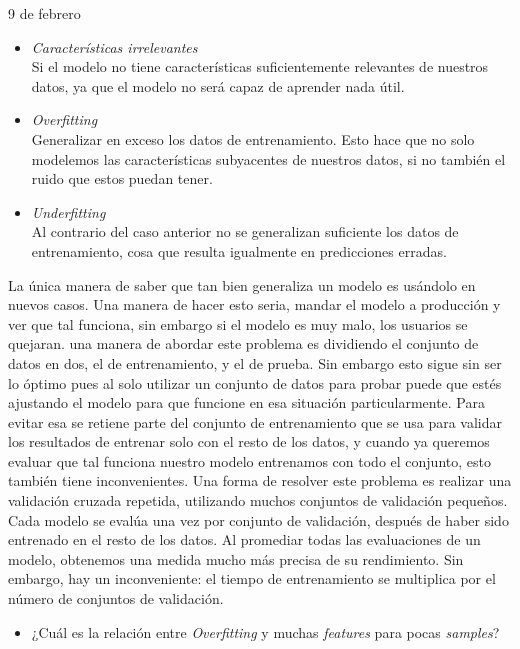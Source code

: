 \begin{entry}{9 de febrero}
\begin{itemize}
    \item\textsl{Características irrelevantes}\\
    Si el modelo no tiene características suficientemente relevantes de nuestros datos, ya que el modelo no será capaz de aprender nada útil.
    
    \item\textsl{Overfitting}\\
    Generalizar en exceso los datos de entrenamiento. Esto hace que no solo modelemos las características subyacentes de nuestros datos, si no también el ruido que estos puedan tener.
    
    \item\textsl{Underfitting}\\
    Al contrario del caso anterior no se generalizan suficiente los datos de entrenamiento, cosa que resulta igualmente en predicciones erradas.
\end{itemize}
La única manera de saber que tan bien generaliza un modelo es usándolo en nuevos casos. Una manera de hacer esto seria, mandar el modelo a producción y ver que tal funciona, sin embargo si el modelo es muy malo, los usuarios se quejaran. una manera de abordar este problema es dividiendo el conjunto de datos en dos, el de entrenamiento, y el de prueba. Sin embargo esto sigue sin ser lo óptimo pues al solo utilizar un conjunto de datos para probar puede que estés ajustando el modelo para que funcione en esa situación particularmente. Para evitar esa se retiene parte del conjunto de entrenamiento que se usa para validar los resultados de entrenar solo con el resto de los datos, y cuando ya queremos evaluar que tal funciona nuestro modelo entrenamos con todo el conjunto, esto también tiene inconvenientes. Una forma de resolver este problema es realizar una validación cruzada repetida, utilizando muchos conjuntos de validación pequeños. Cada modelo se evalúa una vez por conjunto de validación, después de haber sido entrenado en el resto de los datos. Al promediar todas las evaluaciones de un modelo, obtenemos una medida mucho más precisa de su rendimiento. Sin embargo, hay un inconveniente: el tiempo de entrenamiento se multiplica por el número de conjuntos de validación.
\vspace{0.4em}
\tcbsubtitle{\LBltodo}\vspace{-1.25em}
\begin{itemize}
    \item ¿Cuál es la relación entre \textit{Overfitting} y muchas \textit{features} para pocas \textit{samples}?
\end{itemize}
\end{entry}
